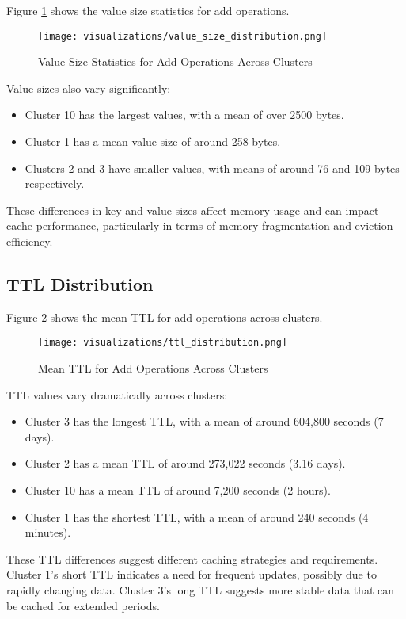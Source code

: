 \documentclass[conference]{IEEEtran}
\begin{document}
Figure \ref{fig:value_size} shows the value size statistics for add operations.

\begin{figure}[htbp]
\centering
    \texttt{[image: visualizations/value\_size\_distribution.png]}
    \caption{Value Size Statistics for Add Operations Across Clusters}
    \label{fig:value_size}
\end{figure}

Value sizes also vary significantly:
\begin{itemize}
    \item Cluster 10 has the largest values, with a mean of over 2500 bytes.
    \item Cluster 1 has a mean value size of around 258 bytes.
    \item Clusters 2 and 3 have smaller values, with means of around 76 and 109 bytes respectively.
\end{itemize}

These differences in key and value sizes affect memory usage and can impact cache performance, particularly in terms of memory fragmentation and eviction efficiency.

\subsection{TTL Distribution}
Figure \ref{fig:ttl} shows the mean TTL for add operations across clusters.

\begin{figure}[htbp]
    \centering
    \texttt{[image: visualizations/ttl\_distribution.png]}
    \caption{Mean TTL for Add Operations Across Clusters}
    \label{fig:ttl}
\end{figure}

TTL values vary dramatically across clusters:
\begin{itemize}
    \item Cluster 3 has the longest TTL, with a mean of around 604,800 seconds (7 days).
    \item Cluster 2 has a mean TTL of around 273,022 seconds (3.16 days).
    \item Cluster 10 has a mean TTL of around 7,200 seconds (2 hours).
    \item Cluster 1 has the shortest TTL, with a mean of around 240 seconds (4 minutes).
\end{itemize}

These TTL differences suggest different caching strategies and requirements. Cluster 1's short TTL indicates a need for frequent updates, possibly due to rapidly changing data. Cluster 3's long TTL suggests more stable data that can be cached for extended periods.
\end{document}
